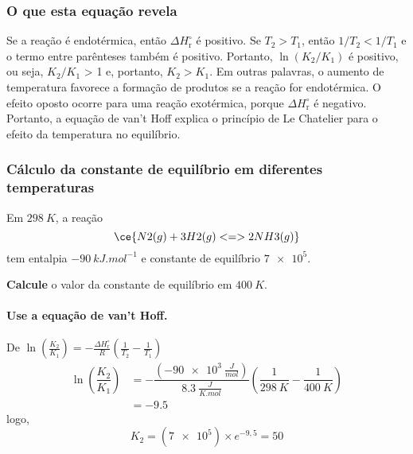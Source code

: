 \begin{info}

\subsubsection{O que esta equação revela}

Se a reação é endotérmica, então \(\Delta H^\circ_\mathrm{r}\) é positivo. Se \(T_2 > T_1\), então \(1/T_2 < 1/T_1\) e o termo entre parênteses também
é positivo. Portanto, \(\ln(K_2/K_1)\) é positivo, ou seja, \(K_2/K_1\) \textgreater{} 1 e, portanto, \(K_2 > K_1\). Em outras palavras, o aumento de
temperatura favorece a formação de produtos se a reação for endotérmica. O efeito oposto ocorre para uma reação exotérmica, porque
\(\Delta H^\circ_\mathrm{r}\) é negativo. Portanto, a equação de van't Hoff explica o princípio de Le Chatelier para o efeito da temperatura no
equilíbrio.

\end{info}

\begin{example}

\subsubsection{Cálculo da constante de equilíbrio em diferentes temperaturas}

Em \(\qty{298}{\unit{K}}\), a reação \[
    \ce{ N2(g) + 3 H2(g) <=> 2 NH3(g) }
\] tem entalpia \(\qty{-90}{\unit{kJ.mol^{-1}}}\) e constante de equilíbrio \(\num{7e5}\).

\textbf{Calcule} o valor da constante de equilíbrio em \(\qty{400}{\unit{K}}\).

\paragraph{Use a equação de van't Hoff.}

De \(\ln \left( \frac{K_2}{K_1} \right) = -\frac{ \Delta H^\circ_\mathrm{r} }{ R } \left( \frac{1}{T_2} - \frac{1}{T_1} \right)\) \[
\begin{aligned}
    \ln \left( \dfrac{K_2}{K_1} \right) 
        &= -\dfrac{ (\qty{-90e3}{\tfrac{\unit{J}}{\unit{mol}}}) }{ \qty{8,3}{\tfrac{\unit{J}}{\unit{K.mol}}}  } \left( \dfrac{1}{ \qty{298}{\unit{K}} } - \dfrac{1}{ \qty{400}{\unit{K}} } \right) \\
        &= \num{-9,5}
\end{aligned}
\] logo, \[
    K_2 = (\num{7e5}) \times e^{-9,5} = \boxed{ 50 }
\]

\end{example}

